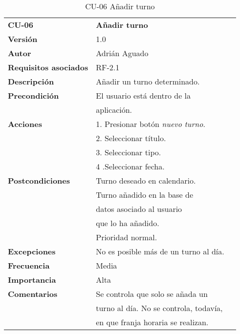 \begin{table}
\begin{tabular}{llr}  
\toprule
\begin{minipage}[b]{0.24\columnwidth}\raggedright\strut
\textbf{CU-06}\strut
\end{minipage} & \begin{minipage}[b]{0.72\columnwidth}\raggedright\strut
\textbf{Añadir turno}\strut
\end{minipage}\tabularnewline
\cmidrule(r){1-2}
\textbf{Versión}       & 1.0           \\
\textbf{Autor}       & Adrián  Aguado    \\
\textbf{Requisitos asociados}       & RF-2.1 \\ 
\textbf{Descripción} & Añadir un turno determinado. \\
\textbf{Precondición} & El usuario está dentro de la \\
& aplicación.       \\
\textbf{Acciones} & 1. Presionar  botón \emph{nuevo turno}. \\
& 2. Seleccionar título. \\
& 3. Seleccionar tipo. \\
& 4 .Seleccionar fecha.\\
\textbf{Postcondiciones} & Turno deseado en calendario. \\
& Turno añadido en la base de \\
&  datos asociado al usuario \\
&  que lo ha añadido.  \\
&  Prioridad normal.  \\
\textbf{Excepciones} &  No es posible más de un turno al día.   \\
\textbf{Frecuencia} & Media          \\
\textbf{Importancia} & Alta            \\
\textbf{Comentarios } &    Se controla que solo se añada un  \\
& turno al día. No se controla, todavía,  \\
& en que franja horaria se realizan. \\
\bottomrule
\end{tabular}
\caption{CU-06 Añadir turno} 
\end{table}




